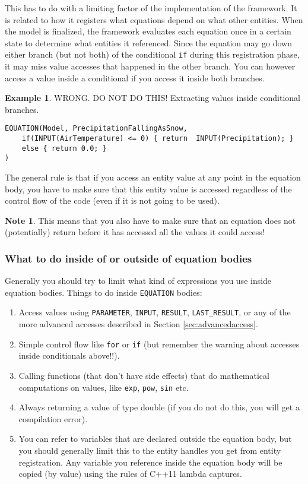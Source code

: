 \documentclass[11pt]{article}
\theoremstyle{definition}
\newtheorem{mynote}{Note}
\newenvironment{note}%
  {\begin{lrbox}{\notebox}%
   \begin{minipage}{\dimexpr\linewidth-2\fboxsep}
   \begin{mynote}}%
  {\end{mynote}%
   \end{minipage}%
   \end{lrbox}%
   \begin{trivlist}
     \item[]\colorbox{silver}{\usebox\notebox}
   \end{trivlist}}
\newtheorem{myexample}{Example}
\newenvironment{example}%
  {\begin{lrbox}{\examplebox}%
   \begin{minipage}{\dimexpr\linewidth-2\fboxsep}
   \begin{myexample}}%
  {\end{myexample}%
   \end{minipage}%
   \end{lrbox}%
   \begin{trivlist}
     \item[]\colorbox{silver}{\usebox\examplebox}
   \end{trivlist}}
\begin{document}
This has to do with a limiting factor of the implementation of the framework. It is related to how it registers what equations depend on what other entities. When the model is finalized, the framework evaluates each equation once in a certain state to determine what entities it referenced. Since the equation may go down either branch (but not both) of the conditional {\tt if} during this registration phase, it may miss value accesses that happened in the other branch. You can however access a value inside a conditional if you access it inside both branches.

\begin{example}\label{ex:simplypequations}
WRONG. DO NOT DO THIS! Extracting values inside conditional branches.
\begin{lstlisting}[style=mycpp]
EQUATION(Model, PrecipitationFallingAsSnow,
	if(INPUT(AirTemperature) <= 0) { return  INPUT(Precipitation); }
	else { return 0.0; }
)
\end{lstlisting}
\end{example}

The general rule is that if you access an entity value at any point in the equation body, you have to make sure that this entity value is accessed regardless of the control flow of the code (even if it is not going to be used).

\begin{note}
This means that you also have to make sure that an equation does not (potentially) return before it has accessed all the values it could access!
\end{note}

\subsubsection{What to do inside of or outside of equation bodies}

Generally you should try to limit what kind of expressions you use inside equation bodies. Things to do inside {\tt EQUATION} bodies:
\begin{enumerate}[i]
\item Access values using {\tt PARAMETER}, {\tt INPUT}, {\tt RESULT}, {\tt LAST\_RESULT}, or any of the more advanced accesses described in Section \ref{sec:advancedaccess}.
\item Simple control flow like {\tt for} or {\tt if} (but remember the warning about accesses inside conditionals above!!).
\item Calling functions (that don't have side effects) that do mathematical computations on values, like {\tt exp}, {\tt pow}, {\tt sin} etc.
\item Always returning a value of type double (if you do not do this, you will get a compilation error).
\item You can refer to variables that are declared outside the equation body, but you should generally limit this to the entity handles you get from entity registration. Any variable you reference inside the equation body will be copied (by value) using the rules of C++11 lambda captures.
\end{enumerate}
\end{document}
